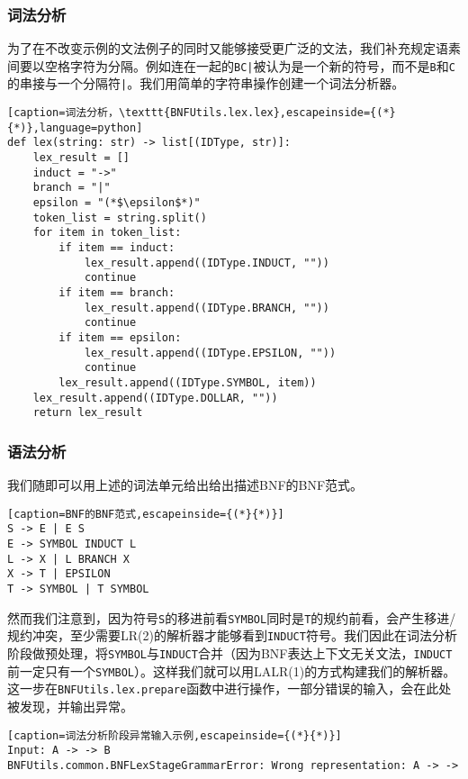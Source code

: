 \subsubsection*{词法分析}

为了在不改变示例的文法例子的同时又能够接受更广泛的文法，我们补充规定语素间要以空格字符为分隔。例如连在一起的\texttt{BC|}被认为是一个新的符号，而不是\texttt{B}和\texttt{C}的串接与一个分隔符\texttt{|}。我们用简单的字符串操作创建一个词法分析器。

\begin{lstlisting}[caption=词法分析，\texttt{BNFUtils.lex.lex},escapeinside={(*}{*)},language=python]
def lex(string: str) -> list[(IDType, str)]:
    lex_result = []
    induct = "->"
    branch = "|"
    epsilon = "(*$\epsilon$*)"
    token_list = string.split()
    for item in token_list:
        if item == induct:
            lex_result.append((IDType.INDUCT, ""))
            continue
        if item == branch:
            lex_result.append((IDType.BRANCH, ""))
            continue
        if item == epsilon:
            lex_result.append((IDType.EPSILON, ""))
            continue
        lex_result.append((IDType.SYMBOL, item))
    lex_result.append((IDType.DOLLAR, ""))
    return lex_result
\end{lstlisting}

\subsubsection*{语法分析}

我们随即可以用上述的词法单元给出给出描述BNF的BNF范式。

\begin{lstlisting}[caption=BNF的BNF范式,escapeinside={(*}{*)}]
S -> E | E S
E -> SYMBOL INDUCT L
L -> X | L BRANCH X
X -> T | EPSILON
T -> SYMBOL | T SYMBOL
\end{lstlisting}

然而我们注意到，因为符号\texttt{S}的移进前看\texttt{SYMBOL}同时是\texttt{T}的规约前看，会产生移进/规约冲突，至少需要LR(2)的解析器才能够看到\texttt{INDUCT}符号。我们因此在词法分析阶段做预处理，将\texttt{SYMBOL}与\texttt{INDUCT}合并（因为BNF表达上下文无关文法，\texttt{INDUCT}前一定只有一个\texttt{SYMBOL}）。这样我们就可以用LALR(1)的方式构建我们的解析器。这一步在\texttt{BNFUtils.lex.prepare}函数中进行操作，一部分错误的输入，会在此处被发现，并输出异常。

\begin{lstlisting}[caption=词法分析阶段异常输入示例,escapeinside={(*}{*)}]
Input: A -> -> B
BNFUtils.common.BNFLexStageGrammarError: Wrong representation: A -> ->
\end{lstlisting}

